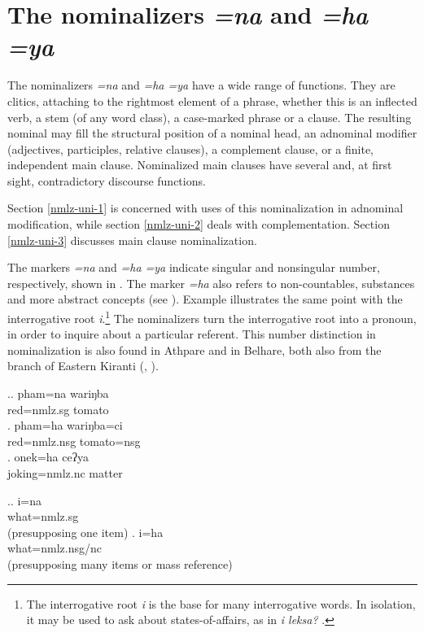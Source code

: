  
\section{The nominalizers \emph{=na} and \emph{=ha \ti =ya} }\label{nmlz-uni}

  
The nominalizers \emph{=na} and \emph{=ha \ti =ya}  have a wide range of functions. They are clitics, attaching to the rightmost element of a phrase, whether this is an inflected verb, a stem (of any word class), a case-marked phrase or a clause. The resulting nominal may  fill the structural position of a nominal head, an adnominal modifier (adjectives, participles, relative clauses), a complement clause, or a finite,  independent  main clause. Nominalized main clauses have several and, at first sight, contradictory discourse functions.

Section \ref{nmlz-uni-1} is concerned with uses of this nominalization in adnominal modification, while section \ref{nmlz-uni-2} deals with complementation. Section \ref{nmlz-uni-3} discusses main clause nominalization.


The markers \emph{=na} and \emph{=ha \ti =ya} indicate singular and nonsingular number, respectively, shown in \Next. The marker \emph{=ha} also refers to non-countables, substances and more abstract concepts (see \Next[c]). Example \NNext illustrates the same point with the interrogative root \emph{i}.\footnote{The interrogative root \emph{i} is the base for many interrogative words. In isolation, it may be used to ask about states-of-affairs, as in  \emph{i leksa?} .} The nominalizers turn the interrogative root into a pronoun, in order to inquire about a particular referent. This number distinction in nominalization is also found in Athpare and in Belhare, both also from the  branch of Eastern Kiranti (\citealt[130]{Ebert1997A-grammar}, \citealt[278]{Bickel1999Nominalization}).


\ex.\ag. pham=na wariŋba\\
red{\sc =nmlz.sg} tomato\\
\bg. pham=ha wariŋba=ci\\
red{\sc =nmlz.nsg} tomato{\sc =nsg}\\
\bg. onek=ha ceʔya\\
joking{\sc =nmlz.nc} matter\\

\ex.\ag. i=na\\
what{\sc =nmlz.sg}\\
 (presupposing one item)
\bg. i=ha\\
what{\sc =nmlz.nsg/nc}\\
 (presupposing many items or mass reference)


